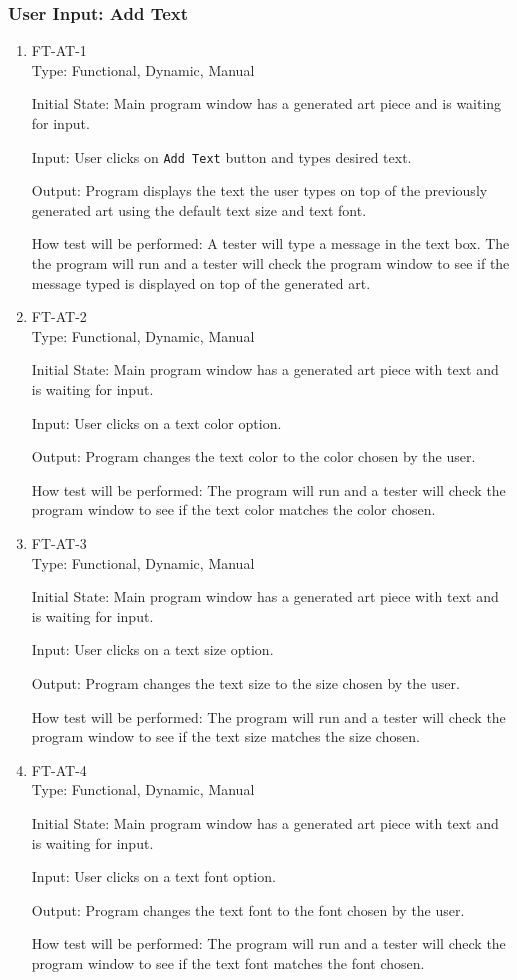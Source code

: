 \documentclass[12pt, titlepage]{article}
\begin{document}
\subsubsection{User Input: Add Text}
\begin{enumerate}

\item{FT-AT-1}\\
Type: Functional, Dynamic, Manual

Initial State: Main program window has a generated art piece and is waiting for input. %

Input: User clicks on \texttt{Add Text} button and types desired text.

Output: Program displays the text the user types on top of the previously generated art using the default text size and text font.

How test will be performed: A tester will type a message in the text box. The the program will run and a tester will check the program window to see if the message typed is displayed on top of the generated art.

\item{FT-AT-2}\\
Type: Functional, Dynamic, Manual

Initial State: Main program window has a generated art piece with text and is waiting for input. %

Input: User clicks on a text color option.

Output: Program changes the text color to the color chosen by the user.

How test will be performed: The program will run and a tester will check the program window to see if the text color matches the color chosen.

\item{FT-AT-3}\\
Type: Functional, Dynamic, Manual

Initial State: Main program window has a generated art piece with text and is waiting for input. %

Input: User clicks on a text size option.

Output: Program changes the text size to the size chosen by the user.

How test will be performed: The program will run and a tester will check the program window to see if the text size matches the size chosen.

\item{FT-AT-4}\\
Type: Functional, Dynamic, Manual

Initial State: Main program window has a generated art piece with text and is waiting for input. %

Input: User clicks on a text font option.

Output: Program changes the text font to the font chosen by the user.

How test will be performed: The program will run and a tester will check the program window to see if the text font matches the font chosen.

\end{enumerate}
\end{document}
